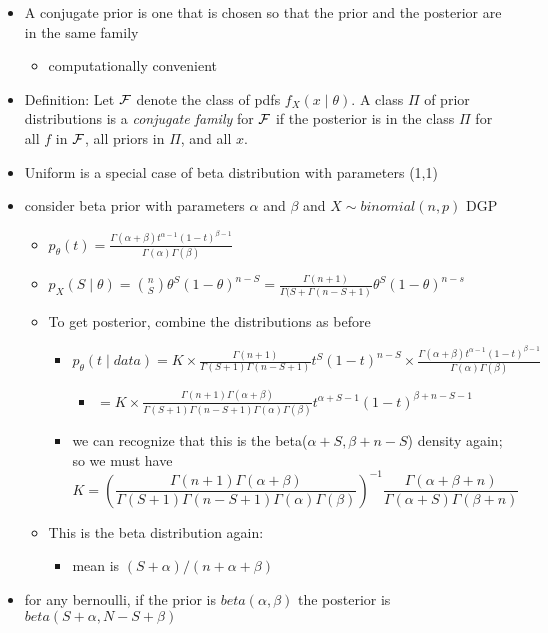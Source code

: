 \begin{itemize}
\item A conjugate prior is one that is chosen so that the prior and
       the posterior are in the same family
\begin{itemize}
\item computationally convenient
\end{itemize}
\item Definition: \citep[From][7.2.3]{CB02} Let $\mathcal{F}$ denote the
  class of pdfs $f_X(x ∣ θ)$.  A class $Π$ of prior distributions is a
  \emph{conjugate family} for $\mathcal{F}$ if the posterior is in the class
  $Π$ for all $f$ in $\mathcal{F}$, all priors in $Π$, and all $x$.
\item Uniform is a special case of beta distribution with
       parameters (1,1)
\item consider beta prior with parameters $α$ and $β$ and
  $X ∼ binomial(n,p)$ DGP
\begin{itemize}
\item $p_θ(t) = \frac{Γ(α + β) t^{α-1} (1-t)^{β-1}}{Γ(α) Γ(β)}$
\item $p_{X}(S ∣ θ) = \binom{n}{S} θ^S (1-θ)^{n-S}
  = \frac{Γ(n + 1)}{Γ(S + Γ(n - S + 1)} θ^S (1-θ)^{n-s}$
\item To get posterior, combine the distributions as before
\begin{itemize}
\item $p_θ(t ∣ data) 
           = K × \frac{Γ(n + 1)}{Γ(S + 1) Γ(n - S + 1)} t^S (1-t)^{n-S} × \frac{Γ(α + β) t^{α-1} (1-t)^{β-1}}{Γ(α) Γ(β)}$
\begin{itemize}
\item $= K × \frac{Γ(n + 1) Γ(α + β)}{Γ(S + 1) Γ(n - S + 1) Γ(α) Γ(β)} t^{α + S - 1} (1 - t)^{β + n - S - 1}$
\end{itemize}
\item we can recognize that this is the beta($α + S, β + n - S$) density again; so we must have 
  \[ K = (\frac{Γ(n + 1) Γ(α + β)}{Γ(S + 1) Γ(n - S + 1)Γ(α)Γ(β)})^{-1} \frac{Γ(α + β + n)}{Γ(α + S)Γ(β + n)} \]
\end{itemize}
\item This is the beta distribution again:
\begin{itemize}
\item mean is $(S + α) / (n + α + β)$
\end{itemize}
\end{itemize}
\item for any bernoulli, if the prior is $beta(α,β)$ the posterior is
  $beta(S + α, N - S + β)$
\end{itemize}

